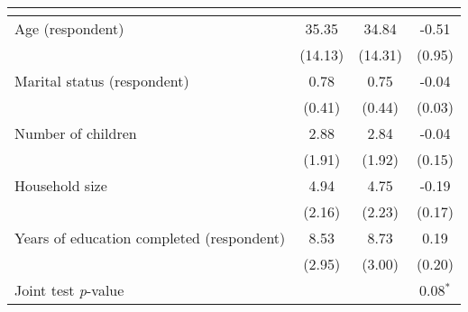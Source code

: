 {
\def\sym#1{\ifmmode^{#1}\else\(^{#1}\)\fi}
\begin{tabular}{l*{3}{c}}
\toprule
          &&&\\
\midrule
Age (respondent)&    35.35&    34.84&    -0.51\\
          &  (14.13)&  (14.31)&   (0.95)\\
Marital status (respondent)&     0.78&     0.75&    -0.04\\
          &   (0.41)&   (0.44)&   (0.03)\\
Number of children&     2.88&     2.84&    -0.04\\
          &   (1.91)&   (1.92)&   (0.15)\\
Household size&     4.94&     4.75&    -0.19\\
          &   (2.16)&   (2.23)&   (0.17)\\
Years of education completed (respondent)&     8.53&     8.73&     0.19\\
          &   (2.95)&   (3.00)&   (0.20)\\
\midrule Joint test \emph{p}-value&         &         &0.08$^{*}$\\
\bottomrule
\end{tabular}
}
